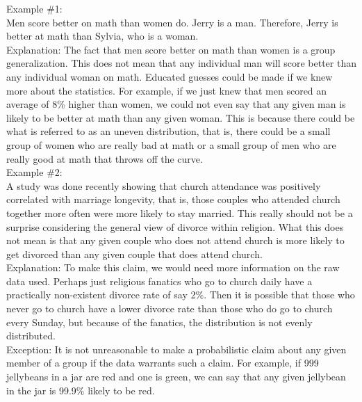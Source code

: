 \documentclass[a4paper,12pt,single,pdftex]{scrartcl}
\begin{document}
    
      Example \#1:
    \\

    
      Men score better on math than women do. Jerry is a man. Therefore, Jerry is better at math than Sylvia, who is a woman.
    \\

    
      Explanation: The fact that men score better on math than women is a group generalization. This does not mean that any individual man will score better than any individual woman on math. Educated guesses could be made if we knew more about the statistics. For example, if we just knew that men scored an average of 8\% higher than women, we could not even say that any given man is likely to be better at math than any given woman. This is because there could be what is referred to as an uneven distribution, that is, there could be a small group of women who are really bad at math or a small group of men who are really good at math that throws off the curve.
    \\

    
      Example \#2:
    \\

    
      A study was done recently showing that church attendance was positively correlated with marriage longevity, that is, those couples who attended church together more often were more likely to stay married. This really should not be a surprise considering the general view of divorce within religion. What this does not mean is that any given couple who does not attend church is more likely to get divorced than any given couple that does attend church.
    \\

    
      Explanation: To make this claim, we would need more information on the raw data used. Perhaps just religious fanatics who go to church daily have a practically non-existent divorce rate of say 2\%. Then it is possible that those who never go to church have a lower divorce rate than those who do go to church every Sunday, but because of the fanatics, the distribution is not evenly distributed.
    \\

    
      Exception: It is not unreasonable to make a probabilistic claim about any given member of a group if the data warrants such a claim. For example, if 999 jellybeans in a jar are red and one is green, we can say that any given jellybean in the jar is  99.9\% likely to be red.
    \\
\end{document}
